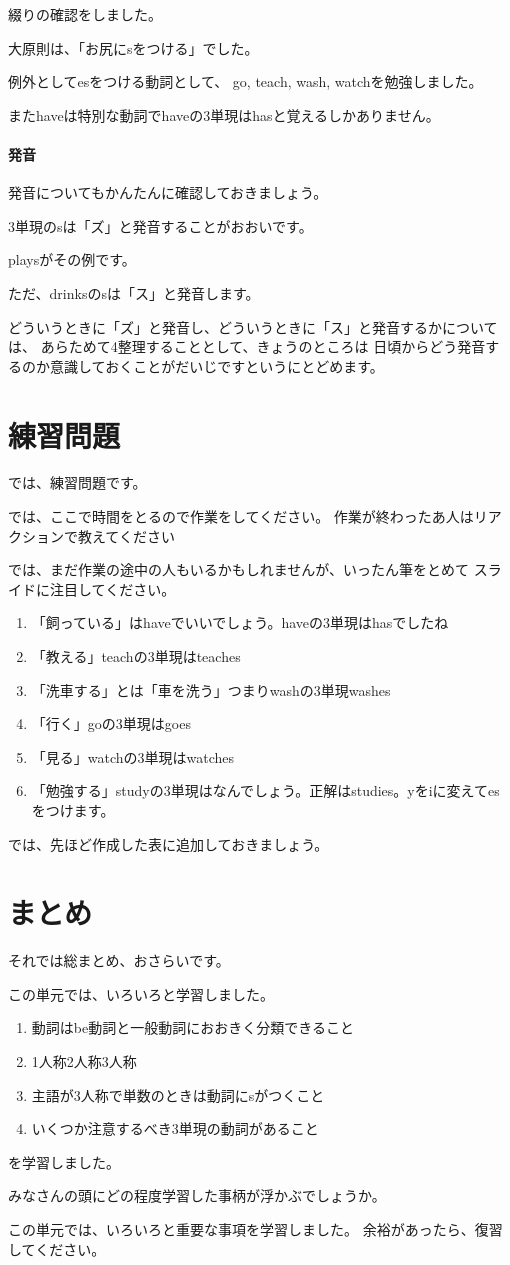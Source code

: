\documentclass[book,jafontscale=0.9247]{jlreq}
\newcommand{\mySagyo}{%
\par%
\bigskip
では、ここで時間をとるので作業をしてください。
作業が終わったあ人はリアクションで教えてください\par%
\begin{minipage}[t]{.98\textwidth}
\mbox{}\hrulefill\mbox{}\par%
\mbox{}\hfill{}\raisebox{-.5\height}{作業}\hfill\mbox{}\par%
\mbox{}\hrulefill\mbox{}
\end{minipage}%
\par%
\bigskip%
では、まだ作業の途中の人もいるかもしれませんが、いったん筆をとめて
スライドに注目してください。%
\par%
\bigskip
}
\begin{document}
綴りの確認をしました。

大原則は、「お尻にsをつける」でした。

例外としてesをつける動詞として、
go, teach, wash, watchを勉強しました。

またhaveは特別な動詞でhaveの3単現はhasと覚えるしかありません。

\paragraph{発音}

発音についてもかんたんに確認しておきましょう。

3単現のsは「ズ」と発音することがおおいです。

playsがその例です。

ただ、drinksのsは「ス」と発音します。

どういうときに「ズ」と発音し、どういうときに「ス」と発音するかについては、
あらためて4整理することとして、きょうのところは
日頃からどう発音するのか意識しておくことがだいじですというにとどめます。


\section{練習問題}

では、練習問題です。

\mySagyo

\begin{enumerate}
 \item 「飼っている」はhaveでいいでしょう。haveの3単現はhasでしたね
 \item 「教える」teachの3単現はteaches
 \item 「洗車する」とは「車を洗う」つまりwashの3単現washes
 \item 「行く」goの3単現はgoes
 \item 「見る」watchの3単現はwatches
 \item 「勉強する」studyの3単現はなんでしょう。正解はstudies。yをiに変えてesをつけます。
\end{enumerate}

では、先ほど作成した表に追加しておきましょう。

\section{まとめ}

それでは総まとめ、おさらいです。

この単元では、いろいろと学習しました。

\begin{enumerate}
 \item 動詞はbe動詞と一般動詞におおきく分類できること
 \item 1人称2人称3人称
 \item 主語が3人称で単数のときは動詞にsがつくこと
 \item いくつか注意するべき3単現の動詞があること
\end{enumerate}
を学習しました。

みなさんの頭にどの程度学習した事柄が浮かぶでしょうか。

この単元では、いろいろと重要な事項を学習しました。
余裕があったら、復習してください。
\end{document}
